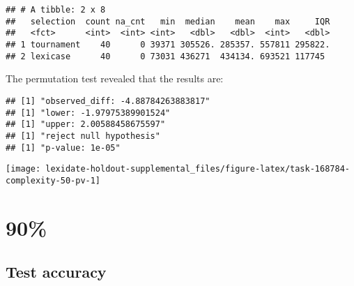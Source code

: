 \documentclass[
]{book}
\newenvironment{Shaded}{\begin{snugshade}}{\end{snugshade}}
\newcommand{\AttributeTok}[1]{\textcolor[rgb]{0.13,0.29,0.53}{#1}}
\newcommand{\DecValTok}[1]{\textcolor[rgb]{0.00,0.00,0.81}{#1}}
\newcommand{\FunctionTok}[1]{\textcolor[rgb]{0.13,0.29,0.53}{\textbf{#1}}}
\newcommand{\NormalTok}[1]{#1}
\newcommand{\OtherTok}[1]{\textcolor[rgb]{0.56,0.35,0.01}{#1}}
\newcommand{\SpecialCharTok}[1]{\textcolor[rgb]{0.81,0.36,0.00}{\textbf{#1}}}
\newcommand{\StringTok}[1]{\textcolor[rgb]{0.31,0.60,0.02}{#1}}
\begin{document}
\begin{verbatim}
## # A tibble: 2 x 8
##   selection  count na_cnt   min  median    mean    max     IQR
##   <fct>      <int>  <int> <int>   <dbl>   <dbl>  <int>   <dbl>
## 1 tournament    40      0 39371 305526. 285357. 557811 295822.
## 2 lexicase      40      0 73031 436271  434134. 693521 117745
\end{verbatim}

The permutation test revealed that the results are:

\begin{Shaded}
\end{Shaded}

\begin{verbatim}
## [1] "observed_diff: -4.88784263883817"
## [1] "lower: -1.97975389901524"
## [1] "upper: 2.00588458675597"
## [1] "reject null hypothesis"
## [1] "p-value: 1e-05"
\end{verbatim}

\texttt{[image: lexidate-holdout-supplemental\_files/figure-latex/task-168784-complexity-50-pv-1]}

\hypertarget{section-53}{%
\section{90\%}\label{section-53}}

\hypertarget{test-accuracy-53}{%
\subsection{Test accuracy}\label{test-accuracy-53}}
\end{document}
